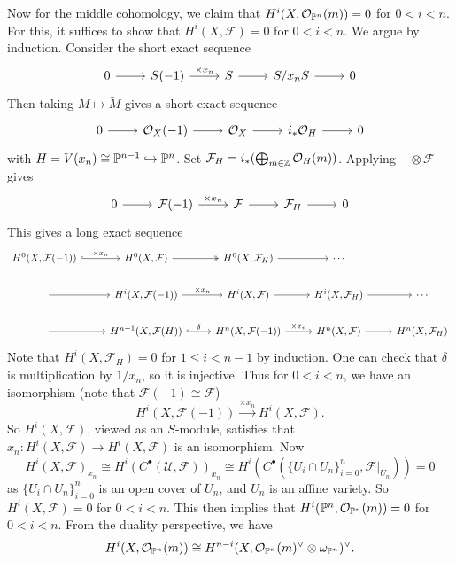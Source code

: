 \begin{example}
  Now for the middle cohomology, we
  claim that $H^i(X, \mathcal{O}_{\mathbb{P}^n}(m)) = 0$
  for $0 < i < n$.
  For this, it suffices to show that
  $H^i(X, \mathcal{F}) = 0$ for $0 < i < n$.
  We argue by induction.
  Consider the short exact sequence
  \[
    \begin{tikzcd}
      0 \ar[r]
      & S(-1) \ar[r, "\times x_n"]
      & S \ar[r]
      & S / x_n S \ar[r] & 0
    \end{tikzcd}
  \]
  Then taking $M \mapsto \widetilde{M}$
  gives a short exact sequence
  \[
    \begin{tikzcd}
    0 \ar[r] & \OO_X(-1)
    \ar[r] & \OO_X \ar[r] &
    i_* \OO_H \ar[r] & 0
    \end{tikzcd}
  \]
  with $H = V(x_n) \cong \mathbb{P}^{n - 1} \hookrightarrow \mathbb{P}^n$.
  Set $\mathcal{F}_H = i_* (\bigoplus_{m \in \mathbb{Z}} \mathcal{O}_H(m))$.
  Applying $- \otimes \mathcal{F}$
  gives
  \[
    \begin{tikzcd}
      0 \ar[r] & \mathcal{F}(-1)
      \ar[r, "\times x_n"]
     & \mathcal{F} \ar[r]
      & \mathcal{F}_H \ar[r] & 0
    \end{tikzcd}
  \]
  This gives a long exact sequence
  \[
    \begin{tikzcd}
    H^0(X, \mathcal{F}(-1))
    \ar[r, "\times x_n", hook] & H^0(X, \mathcal{F})
    \ar[r, two heads] & H^0(X, \mathcal{F}_H)
    \ar[r] & \cdots \\
    \ar[r] & H^i(X, \mathcal{F}(-1))
    \ar[r, "\times x_n"] & H^i(X, \mathcal{F})
    \ar[r] & H^i(X, \mathcal{F}_H)
    \ar[r] & \cdots \\
    \ar[r] & H^{n - 1}(X, \mathcal{F}(H))
    \ar[r, "\delta", hook] & H^n(X, \mathcal{F}(-1))
    \ar[r, "\times x_n"] & H^n(X, \mathcal{F})
    \ar[r] & H^n(X, \mathcal{F}_H)
    \end{tikzcd}
  \]
  Note that $H^i(X, \mathcal{F}_H) = 0$
  for $1 \le i < n - 1$ by induction.
  One can check that $\delta$ is
  multiplication by $1 / x_n$, so it
  is injective.
  Thus for $0 < i < n$,
  we have an isomorphism
  (note that $\mathcal{F}(-1) \cong \mathcal{F}$)
  \[
    H^i(X, \mathcal{F}(-1))
    \overset{\times x_n}{\longrightarrow}
    H^i(X, \mathcal{F}).
  \]
  So $H^i(X, \mathcal{F})$, viewed
  as an $S$-module, satisfies that
  $x_n : H^i(X, \mathcal{F}) \to H^i(X, \mathcal{F})$ is an isomorphism.
  Now
  \[
    H^i(X, \mathcal{F})_{x_n}
    \cong H^i(C^\bullet(\mathcal{U}, \mathcal{F}))_{x_n}
    \cong H^i(C^\bullet(\{U_i \cap U_n\}_{i = 0}^n, \mathcal{F}|_{U_n})) = 0
  \]
  as $\{U_i \cap U_n\}_{i = 0}^n$ is
  an open cover of $U_n$, and $U_n$ is
  an affine variety. So
  $H^i(X, \mathcal{F}) = 0$ for $0 < i < n$.
  This then implies that
  $H^i(\mathbb{P}^n, \mathcal{O}_{\mathbb{P}^n}(m)) = 0$ for
  $0 < i < n$. From the duality perspective,
  we have
  \[
    H^i(X, \mathcal{O}_{\mathbb{P}^n}(m))
    \cong H^{n - i}(X, \mathcal{O}_{\mathbb{P}^n}(m)^\vee \otimes \omega_{\mathbb{P}^n})^\vee.
  \]
\end{example}

